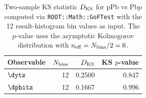 \begin{table}[hbtp]
\centering
\begin{tabular}{|l|r|r|r|}
\hline
Observable & $N_{\rm bins}$ & $D_{\rm KS}$ & KS $p$-value \\
\hline
$\dytz$ & 12 & 0.2500 & 0.847 \\
$\dphitz$ & 12 & 0.1667 & 0.996 \\
\hline
\end{tabular}
\caption{Two-sample KS statistic $D_{\rm KS}$ for pPb vs Pbp computed via \texttt{ROOT::Math::GoFTest} with the 12 result-histogram bin values as input. The $p$-value uses the asymptotic Kolmogorov distribution with $n_{\rm eff} = N_{\rm bins}/2 = 6$.}
\label{table:combining_ks}
\end{table}
